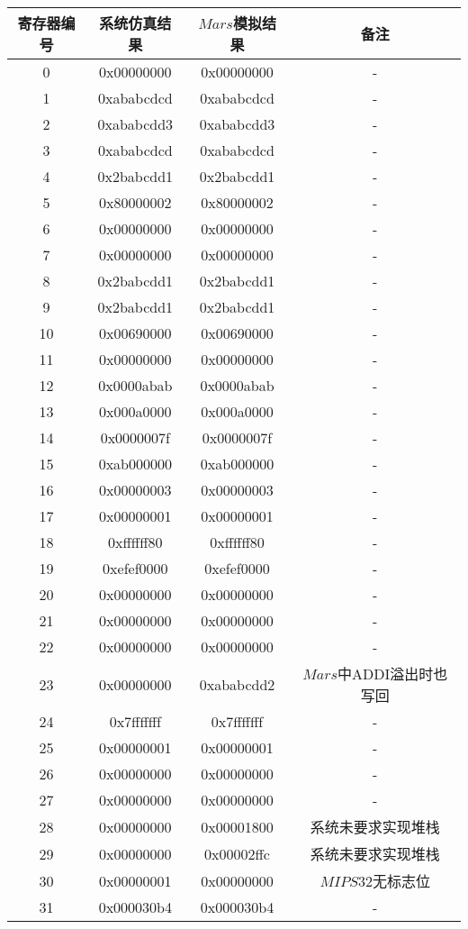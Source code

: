 \documentclass[main.tex]{subfiles}
\begin{document}
\begin{center}
    \begin{longtable}[]{c c c c}
        \toprule
        寄存器编号 & 系统仿真结果 & $Mars$模拟结果 & 备注 \\
        \midrule
        0 & 0x00000000 & 0x00000000 &  - \\
        1 & 0xababcdcd & 0xababcdcd &  - \\
        2 & 0xababcdd3 & 0xababcdd3 &  - \\
        3 & 0xababcdcd & 0xababcdcd &  - \\
        4 & 0x2babcdd1 & 0x2babcdd1 &  - \\
        5 & 0x80000002 & 0x80000002 &  - \\
        6 & 0x00000000 & 0x00000000 &  - \\
        7 & 0x00000000 & 0x00000000 &  - \\
        8 & 0x2babcdd1 & 0x2babcdd1 &  - \\
        9 & 0x2babcdd1 & 0x2babcdd1 &  - \\
        10 & 0x00690000 & 0x00690000 &  - \\
        11 & 0x00000000 & 0x00000000 &  - \\
        12 & 0x0000abab & 0x0000abab &  - \\
        13 & 0x000a0000 & 0x000a0000 &  - \\
        14 & 0x0000007f & 0x0000007f &  - \\
        15 & 0xab000000 & 0xab000000 &  - \\
        16 & 0x00000003 & 0x00000003 &  - \\
        17 & 0x00000001 & 0x00000001 &  - \\
        18 & 0xffffff80 & 0xffffff80 &  - \\
        19 & 0xefef0000 & 0xefef0000 &  - \\
        20 & 0x00000000 & 0x00000000 &  - \\
        21 & 0x00000000 & 0x00000000 &  - \\
        22 & 0x00000000 & 0x00000000 &  - \\
        23 & 0x00000000 & 0xababcdd2 &  $Mars$中ADDI溢出时也写回 \\
        24 & 0x7fffffff & 0x7fffffff &  - \\
        25 & 0x00000001 & 0x00000001 &  - \\
        26 & 0x00000000 & 0x00000000 &  - \\
        27 & 0x00000000 & 0x00000000 &  - \\
        28 & 0x00000000 & 0x00001800 &  系统未要求实现堆栈 \\
        29 & 0x00000000 & 0x00002ffc &  系统未要求实现堆栈 \\
        30 & 0x00000001 & 0x00000000 &  $MIPS32$无标志位 \\
        31 & 0x000030b4 & 0x000030b4 &  - \\
        \bottomrule
    \end{longtable}
\end{center}
\end{document}
